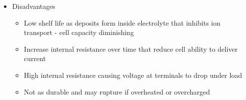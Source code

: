 \documentclass{article}
\begin{document}
\begin{multicols*}{4}
\begin{itemize}
	\item Disadvantages
	\begin{itemize}
		\item Low shelf life as deposits form inside electrolyte that inhibits ion transport - cell capacity diminishing
		\item Increase internal resistance over time that reduce cell ability to deliver current
		\item High internal resistance causing voltage at terminals to drop under load
		\item Not as durable and may rupture if overheated or overcharged
	\end{itemize}
\end{itemize}

\end{multicols*}
\end{document}
